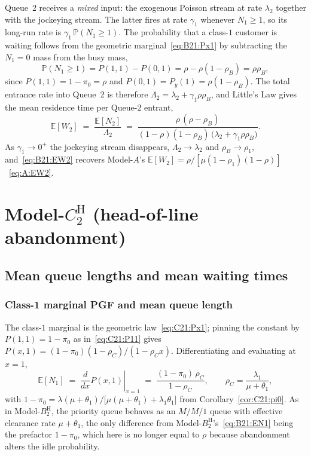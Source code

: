 \documentclass{article}
\numberwithin{equation}{section}
\newcommand{\BH}{B_2^{\mathrm{H}}}
\newcommand{\CH}{C_2^{\mathrm{H}}}
\begin{document}
Queue~2 receives a \emph{mixed} input: the exogenous Poisson stream at rate $\lambda_2$
together with the jockeying stream. The latter fires at rate $\gamma_1$ whenever $N_1\ge1$,
so its long-run rate is $\gamma_1\,\mathbb{P}(N_1\ge1)$. The probability that a class-$1$
customer is waiting follows from the geometric marginal~\eqref{eq:B21:Px1} by subtracting
the $N_1=0$ mass from the busy mass,
\begin{equation*}
    \mathbb{P}(N_1\ge1) = P(1,1)-P(0,1) = \rho - \rho(1-\rho_B) = \rho\rho_B,
\end{equation*}
since $P(1,1)=1-\pi_0=\rho$ and $P(0,1)=P_y(1)=\rho(1-\rho_B)$. The total entrance rate into
Queue~2 is therefore $\Lambda_2=\lambda_2+\gamma_1\rho\rho_B$, and Little's Law gives the
mean residence time per Queue-2 entrant,
\begin{equation}
    \mathbb{E}[W_2] \;=\; \frac{\mathbb{E}[N_2]}{\Lambda_2}
    \;=\; \frac{\rho\,(\rho-\rho_B)}
               {(1-\rho)(1-\rho_B)\,\bigl(\lambda_2+\gamma_1\rho\rho_B\bigr)}.
    \label{eq:B21:EW2}
\end{equation}
As $\gamma_1\to0^+$ the jockeying stream disappears, $\Lambda_2\to\lambda_2$ and
$\rho_B\to\rho_1$, and~\eqref{eq:B21:EW2} recovers Model-$A$'s
$\mathbb{E}[W_2]=\rho/[\mu(1-\rho_1)(1-\rho)]$~\eqref{eq:A:EW2}.

\section{Model-$\CH$ (head-of-line abandonment)}

\subsection{Mean queue lengths and mean waiting times}

\subsubsection{Class-1 marginal PGF and mean queue length}

The class-$1$ marginal is the geometric law~\eqref{eq:C21:Px1}; pinning the constant by
$P(1,1)=1-\pi_0$ as in~\eqref{eq:C21:P11} gives $P(x,1)=(1-\pi_0)(1-\rho_C)/(1-\rho_C x)$.
Differentiating and evaluating at $x=1$,
\begin{equation}
    \mathbb{E}[N_1] \;=\; \left.\frac{d}{dx}P(x,1)\right|_{x=1}
    \;=\; \frac{(1-\pi_0)\,\rho_C}{1-\rho_C},
    \qquad \rho_C=\frac{\lambda_1}{\mu+\theta_1},
    \label{eq:C21:EN1}
\end{equation}
with $1-\pi_0=\lambda(\mu+\theta_1)/\bigl[\mu(\mu+\theta_1)+\lambda_1\theta_1\bigr]$ from
Corollary~\ref{cor:C21:pi0}. As in Model-$\BH$, the priority queue behaves as an $M/M/1$
queue with effective clearance rate $\mu+\theta_1$, the only difference from
Model-$\BH$'s~\eqref{eq:B21:EN1} being the prefactor $1-\pi_0$, which here is no longer
equal to $\rho$ because abandonment alters the idle probability.
\end{document}

